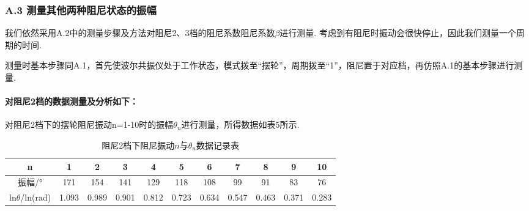 \documentclass[UTF8]{ctexart}
\begin{document}
\subsubsection*{A.3 测量其他两种阻尼状态的振幅}
我们依然采用A.2中的测量步骤及方法对阻尼2、3档的阻尼系数阻尼系数$\beta$进行测量.
考虑到有阻尼时振动会很快停止，因此我们测量一个周期的时间. \par
测量时基本步骤同A.1，首先使波尔共振仪处于工作状态，模式拨至“摆轮”，周期拨至“1”，阻尼置于对应档，再仿照A.1的基本步骤进行测量.\par
\paragraph{对阻尼2档的数据测量及分析如下：}\quad \par

对阻尼2档下的摆轮阻尼振动n=1-10时的振幅$\theta_n$进行测量，所得数据如表5所示. 
\begin{table}[H]
{
\centering
\caption{阻尼2档下阻尼振动$n$与$\theta_n$数据记录表}\hspace{15mm}
\begin{tabular}{|c|c|c|c|c|c|c|c|c|c|c|}
\hline
n&1&2&3&4&5&6&7&8&9&10\\
\hline
振幅/°&171&154&141&129&118&108&99&91&83&76\\ 
\hline
ln$\theta$/ln(rad)&1.093&0.989&0.901&0.812&0.723&0.634&0.547&0.463&0.371&0.283\\
\hline
\end{tabular}}%
\end{table}
\end{document}
